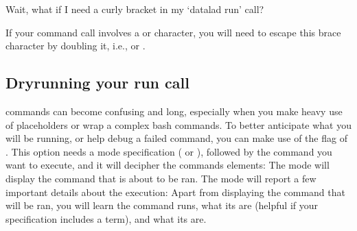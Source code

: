 \ignorespaces \begin{findoutmore}[label={fom-run-curly}, before title={\thetcbcounter\ }, float, floatplacement=tb, check odd page=true]{Wait, what if I need a curly bracket in my ‘datalad run’ call?}
\label{\detokenize{basics/101-110-run2:fom-run-curly}}

\sphinxAtStartPar
If your command call involves a \sphinxcode{\sphinxupquote{\{}} or \sphinxcode{\sphinxupquote{\}}} character, you will need to escape
this brace character by doubling it, i.e., \sphinxcode{\sphinxupquote{\{\{}} or \sphinxcode{\sphinxupquote{\}\}}}.


\end{findoutmore}

\ignorespaces 

\subsection{Dry\sphinxhyphen{}running your run call}
\label{\detokenize{basics/101-110-run2:dry-running-your-run-call}}\label{\detokenize{basics/101-110-run2:dryrun}}\label{\detokenize{basics/101-110-run2:index-12}}
\sphinxAtStartPar
{} commands can become confusing and long, especially when you make heavy use of placeholders or wrap a complex bash commands.
To better anticipate what you will be running, or help debug a failed command, you can make use of the   flag of .
This option needs a mode specification ( or ), followed by the  command you want to execute, and it will decipher the commands elements:
The mode  will display the command that is about to be ran.
The mode  will report a few important details about the execution:
Apart from displaying the command that will be ran, you will learn  the command runs, what its  are (helpful if your  specification includes a {\hyperref[\detokenize{glossary:term-globbing}]{}} term), and what its  are.

